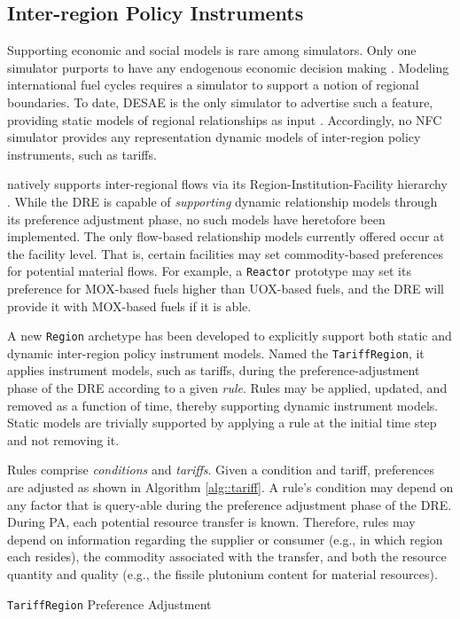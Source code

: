 
\subsection{Inter-region Policy Instruments}\label{meth:tariff}

Supporting economic and social models is rare among simulators. Only one
simulator purports to have any endogenous economic decision making
\cite{van_den_durpel_daness_2009}. Modeling international fuel cycles requires a
simulator to support a notion of regional boundaries. To date, DESAE is the only
simulator to advertise such a feature, providing static models of regional
relationships as input \cite{andrianova_desae_2008}. Accordingly, no NFC
simulator provides any representation dynamic models of inter-region policy
instruments, such as tariffs.

\Cyclus natively supports inter-regional flows via its
Region-Institution-Facility hierarchy \cite{huff_cyclus_2015}. While the DRE is
capable of \textit{supporting} dynamic relationship models through its
preference adjustment phase, no such models have heretofore been
implemented. The only flow-based relationship models currently offered occur at
the facility level. That is, certain facilities may set commodity-based
preferences for potential material flows. For example, a \texttt{Reactor}
prototype may set its preference for MOX-based fuels higher than UOX-based
fuels, and the DRE will provide it with MOX-based fuels if it is able.

A new \texttt{Region} archetype has been developed to explicitly support both
static and dynamic inter-region policy instrument models. Named the
\texttt{TariffRegion}, it applies instrument models, such as tariffs, during the
preference-adjustment phase of the DRE according to a given \textit{rule}. Rules
may be applied, updated, and removed as a function of time, thereby supporting
dynamic instrument models. Static models are trivially supported by applying a
rule at the initial time step and not removing it.

Rules comprise \textit{conditions} and \textit{tariffs}. Given a
condition and tariff, preferences are adjusted as shown in Algorithm
\ref{alg::tariff}. A rule's condition may depend on any factor that is
query-able during the preference adjustment phase of the DRE. During PA, each
potential resource transfer is known. Therefore, rules may depend on information
regarding the supplier or consumer (e.g., in which region each resides), the
commodity associated with the transfer, and both the resource quantity and
quality (e.g., the fissile plutonium content for material resources).


\begin{algorithm}[!h]
 \SetAlgoLined
 \caption{\texttt{TariffRegion} Preference Adjustment}\label{alg::tariff}
\end{algorithm}


